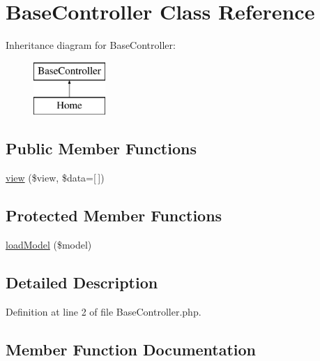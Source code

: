 \hypertarget{class_base_controller}{}\section{Base\+Controller Class Reference}
\label{class_base_controller}
Inheritance diagram for Base\+Controller\+:\begin{figure}[H]
\begin{center}
\leavevmode
\includegraphics[height=2.000000cm]{class_base_controller}
\end{center}
\end{figure}
\subsection*{Public Member Functions}
\begin{DoxyCompactItemize}
\item 
\hyperlink{class_base_controller_a2c835b7c72f07e978eac1f6ed2e9341e}{view} (\$view, \$data=\mbox{[}$\,$\mbox{]})
\end{DoxyCompactItemize}
\subsection*{Protected Member Functions}
\begin{DoxyCompactItemize}
\item 
\hyperlink{class_base_controller_a31925ff6c6c23e4015d45a44c78a461b}{load\+Model} (\$model)
\end{DoxyCompactItemize}


\subsection{Detailed Description}


Definition at line 2 of file Base\+Controller.\+php.



\subsection{Member Function Documentation}
\hypertarget{class_base_controller_a31925ff6c6c23e4015d45a44c78a461b}{}\label{class_base_controller_a31925ff6c6c23e4015d45a44c78a461b} 
